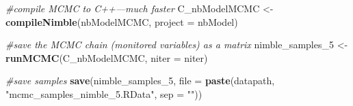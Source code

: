 \documentclass[]{article}
\newenvironment{Shaded}{\begin{snugshade}}{\end{snugshade}}
\newcommand{\KeywordTok}[1]{\textcolor[rgb]{0.13,0.29,0.53}{\textbf{#1}}}
\newcommand{\DataTypeTok}[1]{\textcolor[rgb]{0.13,0.29,0.53}{#1}}
\newcommand{\DecValTok}[1]{\textcolor[rgb]{0.00,0.00,0.81}{#1}}
\newcommand{\StringTok}[1]{\textcolor[rgb]{0.31,0.60,0.02}{#1}}
\newcommand{\CommentTok}[1]{\textcolor[rgb]{0.56,0.35,0.01}{\textit{#1}}}
\newcommand{\NormalTok}[1]{#1}
\begin{document}
\begin{Shaded}
\begin{Highlighting}[]
\CommentTok{#compile MCMC to C++—much faster}
\NormalTok{C_nbModelMCMC <-}\StringTok{ }\KeywordTok{compileNimble}\NormalTok{(nbModelMCMC, }\DataTypeTok{project =}\NormalTok{ nbModel)}

\CommentTok{#save the MCMC chain (monitored variables) as a matrix}
\NormalTok{nimble_samples_}\DecValTok{5}\NormalTok{ <-}\StringTok{ }\KeywordTok{runMCMC}\NormalTok{(C_nbModelMCMC, }\DataTypeTok{niter =}\NormalTok{ niter)}

\CommentTok{#save samples}
\KeywordTok{save}\NormalTok{(nimble_samples_}\DecValTok{5}\NormalTok{,}
        \DataTypeTok{file =} \KeywordTok{paste}\NormalTok{(datapath,}
                    \StringTok{"mcmc_samples_nimble_5.RData"}\NormalTok{,}
                    \DataTypeTok{sep =} \StringTok{""}\NormalTok{))}
\end{Highlighting}
\end{Shaded}
\end{document}
